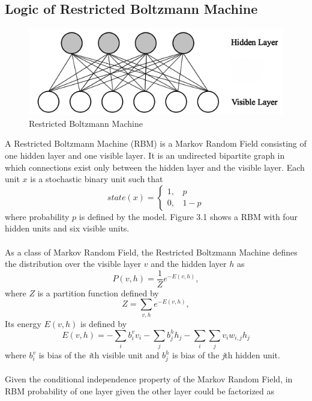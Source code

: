 \documentclass[12pt]{article}
\begin{document}
\subsection{Logic of Restricted Boltzmann Machine}
\begin{figure}[h]
\centering
\includegraphics[height=1.5in]{RBM.png}
\caption{Restricted Boltzmann Machine} \label{fig:side:a}
\end{figure}
A Restricted Boltzmann Machine (RBM) is a Markov Random Field consisting of one hidden layer and one visible layer. It is an undirected bipartite graph in which connections exist only between the hidden layer and the visible layer. Each unit $x$ is a stochastic binary unit such that\begin{equation}
state(x)=\begin{cases}1,~~~~p\\
0,~~~~1-p
\end{cases}
\end{equation}
where probability $p$ is defined by the model. Figure 3.1 shows a RBM with four hidden units and six visible units.\\
\\
As a class of Markov Random Field, the Restricted Boltzmann Machine defines the  distribution over the visible layer $v$ and the hidden layer $h$ as \begin{equation}
P(v,h) = \frac{1}{Z} e^{-E(v,h)},
\end{equation}
where $Z$ is a partition function defined by \begin{equation}
Z = \sum_{v, h} e^{-E(v,h)},
\end{equation}
Its energy $E(v,h)$ is defined by \begin{equation}
E(v,h) = -\sum_i b^v_i v_i - \sum_j b^h_j h_j -\sum_i \sum_j v_i w_{i,j} h_j
\end{equation}
where $b^v_i$ is bias of the \emph{i}th visible unit and $b^h_j$ is bias of the \emph{j}th hidden unit.\\
\\
Given the conditional independence property of the Markov Random Field, in RBM probability of one layer given the other layer could be factorized as
\end{document}
